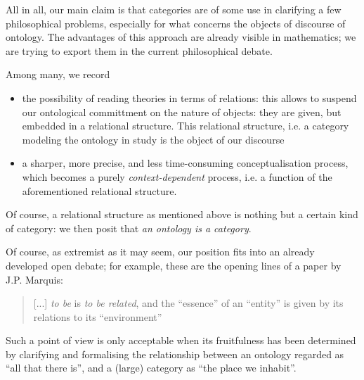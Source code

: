 All in all, our main claim is that categories are of some use in clarifying a few philosophical problems, especially for what concerns the objects of discourse of ontology. The advantages of this approach are already visible in mathematics; we are trying to export them in the current philosophical debate.

Among many, we record
\begin{itemize}
	\item the possibility of reading theories in terms of relations: this allows to suspend our ontological committment on the nature of objects: they are given, but embedded in a relational structure. This relational structure, i.e. a category modeling the ontology in study is the object of our discourse
	\item a sharper, more precise, and less time-consuming conceptualisation process, which becomes a purely \emph{context-dependent} process, i.e. a function of the aforementioned relational structure.
\end{itemize}
Of course, a relational structure as mentioned above is nothing but a certain kind of category: we then posit that \emph{an ontology is a category}.

Of course, as extremist as it may seem, our position fits into an already developed open debate; for example, these are the opening lines of a paper by J.P. Marquis:
\begin{quote}
	[...] \emph{to be} is \emph{to be related}, and the ``essence'' of an ``entity'' is given by its relations to its ``environment''
	\hfill \cite{Marquis1997}
\end{quote}
Such a point of view is only acceptable when its fruitfulness has been determined by clarifying and formalising the relationship between an ontology regarded as ``all that there is'', and a (large) category as ``the place we inhabit''.

